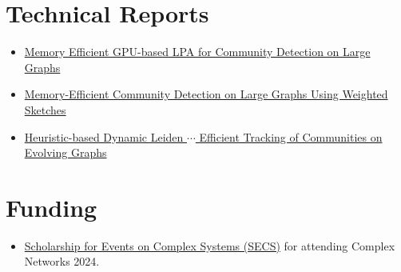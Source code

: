 \section*{Technical Reports}

\begin{itemize}[noitemsep, leftmargin=*]
  \item \href{https://arxiv.org/abs/2411.19901}{Memory Efficient GPU-based LPA for Community Detection on Large Graphs}
  \item \href{https://arxiv.org/abs/2411.02268}{Memory-Efficient Community Detection on Large Graphs Using Weighted Sketches}
  \item \href{https://arxiv.org/abs/2410.15451}{Heuristic-based Dynamic Leiden $\cdots$ Efficient Tracking of Communities on Evolving Graphs}
\end{itemize}




\section*{Funding}

\begin{itemize}[noitemsep, leftmargin=*]
  \item \href{https://yrcss.cssociety.org/grants/secs/}{Scholarship for Events on Complex Systems (SECS)} for attending Complex Networks 2024.
\end{itemize}
